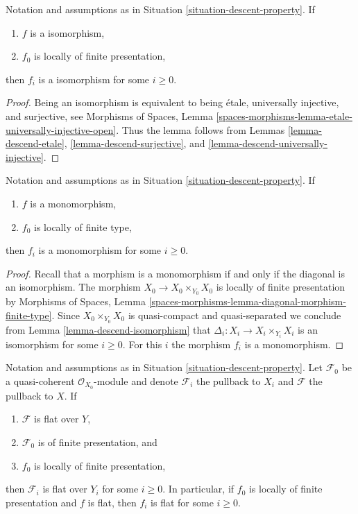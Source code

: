 \begin{lemma}
\label{lemma-descend-isomorphism}
Notation and assumptions as in Situation \ref{situation-descent-property}. If
\begin{enumerate}
\item $f$ is a isomorphism,
\item $f_0$ is locally of finite presentation,
\end{enumerate}
then $f_i$ is a isomorphism for some $i \geq 0$.
\end{lemma}

\begin{proof}
Being an isomorphism is equivalent to being \'etale, universally injective,
and surjective, see
Morphisms of Spaces, Lemma
\ref{spaces-morphisms-lemma-etale-universally-injective-open}.
Thus the lemma follows from
Lemmas \ref{lemma-descend-etale},
\ref{lemma-descend-surjective}, and
\ref{lemma-descend-universally-injective}.
\end{proof}

\begin{lemma}
\label{lemma-descend-monomorphism}
Notation and assumptions as in Situation \ref{situation-descent-property}. If
\begin{enumerate}
\item $f$ is a monomorphism,
\item $f_0$ is locally of finite type,
\end{enumerate}
then $f_i$ is a monomorphism for some $i \geq 0$.
\end{lemma}

\begin{proof}
Recall that a morphism is a monomorphism if and only if the diagonal is
an isomorphism. The morphism $X_0 \to X_0 \times_{Y_0} X_0$ is locally of
finite presentation by
Morphisms of Spaces, Lemma
\ref{spaces-morphisms-lemma-diagonal-morphism-finite-type}.
Since $X_0 \times_{Y_0} X_0$ is quasi-compact and quasi-separated
we conclude from
Lemma \ref{lemma-descend-isomorphism}
that $\Delta_i : X_i \to X_i \times_{Y_i} X_i$ is an isomorphism for
some $i \geq 0$. For this $i$ the morphism $f_i$ is a monomorphism.
\end{proof}

\begin{lemma}
\label{lemma-descend-flat}
Notation and assumptions as in Situation \ref{situation-descent-property}.
Let $\mathcal{F}_0$ be a quasi-coherent $\mathcal{O}_{X_0}$-module
and denote $\mathcal{F}_i$ the pullback to $X_i$ and $\mathcal{F}$
the pullback to $X$. If
\begin{enumerate}
\item $\mathcal{F}$ is flat over $Y$,
\item $\mathcal{F}_0$ is of finite presentation, and
\item $f_0$ is locally of finite presentation,
\end{enumerate}
then $\mathcal{F}_i$ is flat over $Y_i$ for some $i \geq 0$.
In particular, if $f_0$ is locally of finite presentation and
$f$ is flat, then $f_i$ is flat for some $i \geq 0$.
\end{lemma}

